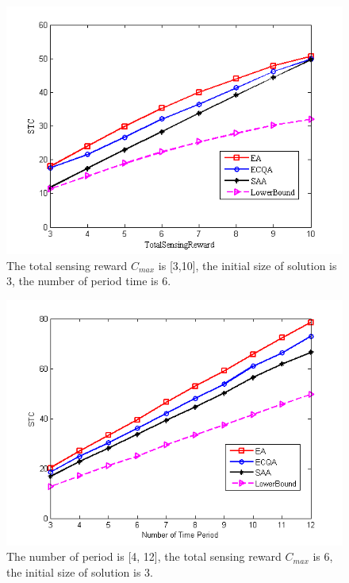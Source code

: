 \documentclass[journal]{IEEEtran}
\begin{document}
\begin{figure}
	\centering
	\includegraphics[width=1\linewidth]{Fig4(a).png}
	\caption{The total sensing reward $C_{max}$ is [3,10], the initial size of solution is 3, the number of period time is 6.}
	\label{fig:figure4}
\end{figure}
\begin{figure}
	\centering
	\includegraphics[width=1\linewidth]{Fig4(c).png}
	\caption{ The number of period is [4, 12], the total sensing reward $C_{max}$ is 6, the initial size of solution is 3.}
	\label{fig:figure5}
\end{figure}
\end{document}
